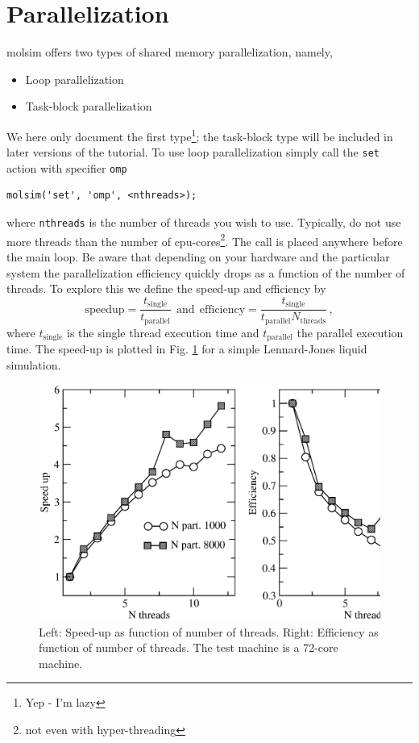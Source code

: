 \documentclass[11pt]{article}
\begin{document}
\section{Parallelization}
\textsf{molsim} offers two types of shared memory parallelization, namely,
\begin{itemize}
\item Loop parallelization 
\item Task-block parallelization
\end{itemize}
We here only document the first type\footnote{Yep - I'm lazy}; the task-block
type will be included in later versions of the tutorial. To use loop
parallelization simply call the \verb!set! action with specifier \verb!omp!
\begin{verbatim}
molsim('set', 'omp', <nthreads>);
\end{verbatim}
where \verb!nthreads! is the number of threads you wish to use. Typically, do
not use more threads than the number of cpu-cores\footnote{not even with
  hyper-threading}.  The call is placed anywhere before the main loop. Be aware
that depending on your hardware and the particular system the parallelization
efficiency quickly drops as a function of the number of threads. To explore this we
define the speed-up and efficiency by
\begin{equation}
  \mathrm{speedup} = \frac{t_\mathrm{single}}{t_\mathrm{parallel}} \ \
  \mathrm{and} \ \ 
  \mathrm{efficiency} = \frac{t_\mathrm{single}}{t_\mathrm{parallel}
    N_\mathrm{threads}}
  \, ,
\end{equation}
where $t_\mathrm{single}$ is the single thread execution time and
$t_\mathrm{parallel}$ the parallel execution time. The speed-up is plotted in
Fig. \ref{fig:bench} for a simple Lennard-Jones liquid simulation.
\begin{figure}[h]
  \begin{center}
    \includegraphics[scale=.4]{speedup.eps}
  \caption{
    \label{fig:bench}
    Left: Speed-up as function of number of threads. Right: Efficiency as
    function of number of threads. The test machine is a 72-core machine.
  }
  \end{center}
\end{figure}
\end{document}
